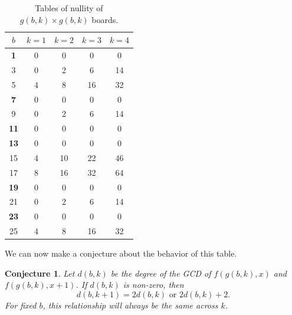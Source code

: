 \documentclass{article}
\newtheorem{conjecture}{Conjecture}
\begin{document}
	\begin{table}[H]
		\renewcommand{\arraystretch}{1.5}
		\centering
		\begin{tabular}{|c||c|c|c|c|}
			\hline
			$b$ & $k=1$ & $k=2$ & $k=3$ & $k=4$ \\
			\hline\hline
			\textbf{1} & 0 & 0 & 0 & 0 \\
			\hline
			3 & 0 & 2 & 6 & 14 \\
			\hline
			5 & 4 & 8 & 16 & 32 \\
			\hline
			\textbf{7} & 0 & 0 & 0 & 0 \\
			\hline
			9 & 0 & 2 & 6 & 14 \\
			\hline
			\textbf{11} & 0 & 0 & 0 & 0  \\
			\hline
			\textbf{13} & 0 & 0 & 0 & 0 \\
			\hline
			15 & 4 & 10 & 22 & 46 \\
			\hline
			17 & 8 & 16 & 32 & 64 \\
			\hline
			\textbf{19} & 0 & 0 & 0 & 0 \\
			\hline
			21 & 0 & 2 & 6 & 14 \\
			\hline
			\textbf{23} & 0 & 0 & 0 & 0 \\
			\hline
			25 & 4 & 8 & 16 & 32 \\
			\hline
		\end{tabular}
		\caption{Tables of nullity of $g(b,k) \times g(b,k)$ boards.}
	\end{table}
	
	We can now make a conjecture about the behavior of this table.
	
	\begin{conjecture}
		Let $d(b,k)$ be the degree of the GCD of $f(g(b,k),x)$ and $f(g(b,k),x+1)$.
		If $d(b,k)$ is non-zero, then
		\begin{equation*}
			d(b,k+1) = 2d(b,k) \text{ or } 2d(b,k)+2.
		\end{equation*}
		For fixed $b$, this relationship will always be the same across $k$.
	\end{conjecture}
\end{document}
